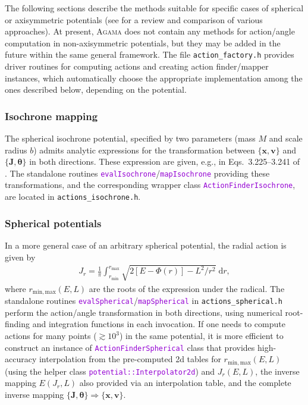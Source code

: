 \documentclass[12pt]{article}
\newcommand{\Agama}{\textsc{Agama}\xspace}
\newcommand{\ttt}[1]{\textcolor{darkviolet}{\texttt{#1}}}
\renewcommand{\d}{\mathrm{d}}
\newcommand{\bv}{\boldsymbol{v}}
\newcommand{\bx}{\boldsymbol{x}}
\newcommand{\bJ}{\boldsymbol{J}}
\newcommand{\bt}{\boldsymbol{\theta}}
\begin{document}
The following sections describe the methods suitable for specific cases of spherical or axisymmetric potentials (see \cite{SandersBinney2016} for a review and comparison of various approaches).
At present, \Agama does not contain any methods for action/angle computation in non\--axi\-sym\-met\-ric potentials, but they may be added in the future within the same general framework.
The file \texttt{action_factory.h} provides driver routines for computing actions and creating action finder/mapper instances, which automatically choose the appropriate implementation among the ones described below, depending on the potential.


\subsubsection{Isochrone mapping}  \label{sec:ActionsIsochrone}

The spherical isochrone potential, specified by two parameters (mass $M$ and scale radius $b$) admits analytic expressions for the transformation between $\{\bx,\bv\}$ and $\{\bJ,\bt\}$ in both directions. These expression are given, e.g., in Eqs.~3.225--3.241 of \cite{BinneyTremaine}.
The standalone routines \ttt{evalIsochrone}/\ttt{mapIsochrone} providing these transformations, %
and the corresponding wrapper class \ttt{ActionFinderIsochrone},
are located in \texttt{actions_isochrone.h}.


\subsubsection{Spherical potentials}  \label{sec:ActionsSpherical}

In a more general case of an arbitrary spherical potential, the radial action is given by 
\begin{align*}
J_r = \frac{1}{\pi} \int_{r_\mathrm{min}}^{r_\mathrm{max}} \sqrt{2[E-\Phi(r)] - L^2/r^2}\;\d r,
\end{align*}
where $r_\mathrm{min,max}(E,L)$ are the roots of the expression under the radical.
The standalone routines \ttt{evalSpherical}/\ttt{mapSpherical} in \texttt{actions_spherical.h} perform the action/angle transformation in both directions, using numerical root-finding and integration functions in each invocation. If one needs to compute actions for many points ($\gtrsim 10^3$) in the same potential, it is more efficient to construct an instance of \ttt{ActionFinderSpherical} class that provides high-accuracy interpolation from the pre-computed 2d tables for $r_\mathrm{min,max}(E,L)$ (using the helper class \ttt{potential::Interpolator2d}) and $J_r(E,L)$, the inverse mapping $E(J_r,L)$ also provided via an interpolation table, and the complete inverse mapping $\{\bJ,\bt\} \Rightarrow \{\bx,\bv\}$.
\end{document}
